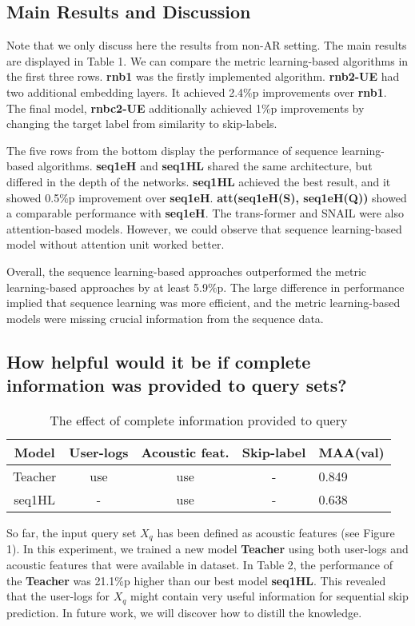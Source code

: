 \subsection{Main Results and Discussion}
Note that we only discuss here the results from non-AR setting. The main results are displayed in Table 1. We can compare the metric learning-based algorithms in the first three rows. \textbf{rnb1} was the firstly implemented algorithm. \textbf{rnb2-UE} had two additional embedding layers. It achieved 2.4\%p improvements over \textbf{rnb1}. The final model, \textbf{rnbc2-UE} additionally achieved 1\%p improvements by changing the target label from similarity to skip-labels.

The five rows from the bottom  display the performance of sequence learning-based algorithms. \textbf{seq1eH} and \textbf{seq1HL} shared the same architecture, but differed in the depth of the networks. \textbf{seq1HL} achieved the best result, and it showed 0.5\%p improvement over \textbf{seq1eH}. \textbf{att(seq1eH(S), seq1eH(Q))} showed a comparable performance with \textbf{seq1eH}. The trans-former\cite{vaswani2017attention} and SNAIL\cite{snail} were also attention-based models. However, we could observe that sequence learning-based model without attention unit worked better. 

Overall, the sequence learning-based approaches outperformed the metric learning-based approaches by at least 5.9\%p. The large difference in performance implied that sequence learning was more efficient, and the metric learning-based models were missing crucial information from the sequence data.

\subsection{How helpful would it be if complete information was provided to query sets?}
\begin{table}
\small
  \caption{The effect of complete information provided to query}
  \label{tab:freq}
  \begin{tabular}{ccccl}
    \toprule
    Model&User-logs & Acoustic feat. & Skip-label & MAA(val) \\
    \midrule
    Teacher&use  & use & - & 0.849\\
    seq1HL&-   & use & - & 0.638\\
    
 
  \bottomrule
\end{tabular}

\end{table}
So far, the input query set $X_q$ has been defined as acoustic features (see Figure 1). In this experiment, we trained a new model \textbf{Teacher} using both user-logs and acoustic features that were available in dataset. In Table 2, the performance of the \textbf{Teacher} was 21.1\%p higher than our best model \textbf{seq1HL}. This revealed that the user-logs for $X_q$ might contain very useful information for sequential skip prediction. In future work, we will discover how to distill the knowledge.


